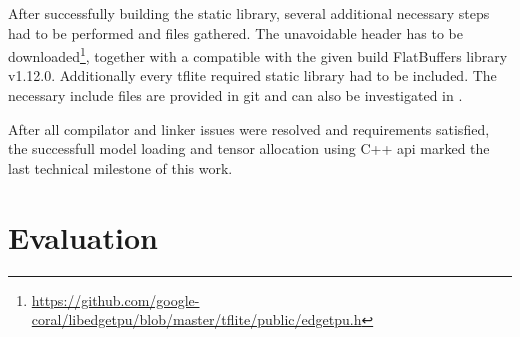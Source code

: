 {After successfully building the static  library, several additional necessary steps had to be performed and files gathered.
The unavoidable  header has to be downloaded\footnote{\url{https://github.com/google-coral/libedgetpu/blob/master/tflite/public/edgetpu.h}},
together with a compatible with the given build FlatBuffers library v1.12.0. Additionally every \gls{tflite} required static library had to be included.
The necessary include files are provided in git and can also be investigated in .

After all compilator and linker issues were resolved and requirements satisfied, the successfull model loading and tensor allocation using C++ \gls{api}
marked the last technical milestone of this work.

\section{Evaluation}
\label{sec:evaluation}




}